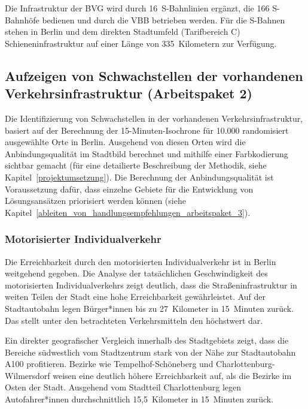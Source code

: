 Die Infrastruktur der BVG wird durch 16~S-Bahnlinien ergänzt, die 166 S-Bahnhöfe bedienen und durch die VBB betrieben werden. Für die S-Bahnen stehen in Berlin und dem direkten Stadtumfeld (Tarifbereich C) Schieneninfrastruktur auf einer Länge von 335~Kilometern zur Verfügung.

\subsection{Aufzeigen von Schwachstellen der vorhandenen Verkehrsinfrastruktur (Arbeitspaket 2)}

\label{aufzeigen_von_schwachstellen_der_vorhandenen_infrastruktur_arbeitspaket_2}

Die Identifizierung von Schwachstellen in der vorhandenen Verkehrsinfrastruktur, basiert auf der Berechnung der 15-Minuten-Isochrone für 10.000 randomisiert ausgewählte Orte in Berlin. Ausgehend von diesen Orten wird die Anbindungsqualität im Stadtbild berechnet und mithilfe einer Farbkodierung sichtbar gemacht (für eine detailierte Beschreibung der Methodik, siehe Kapitel~\ref{projektumsetzung}). Die Berechnung der Anbindungsqualität ist Voraussetzung dafür, dass einzelne Gebiete für die Entwicklung von Lösungsansätzen priorisiert werden können (siehe Kapitel~\ref{ableiten_von_handlungsempfehlungen_arbeitspaket_3}).

\subsubsection{Motorisierter Individualverkehr}

Die Erreichbarkeit durch den motorisierten Individualverkehr ist in Berlin weitgehend gegeben. Die Analyse der tatsächlichen Geschwindigkeit des motorisierten Individualverkehrs zeigt deutlich, dass die Straßeninfrastruktur in weiten Teilen der Stadt eine hohe Erreichbarkeit gewährleistet. Auf der Stadtautobahn legen Bürger*innen bis zu 27~Kilometer in 15~Minuten zurück. Das stellt unter den betrachteten Verkehrsmitteln den höchstwert dar.


Ein direkter geografischer Vergleich innerhalb des Stadtgebiets zeigt, dass die Bereiche südwestlich vom Stadtzentrum stark von der Nähe zur Stadtautobahn A100 profitieren. Bezirke wie Tempelhof-Schöneberg und Charlottenburg-Wilmersdorf weisen eine deutlich höhere Erreichbarkeit auf, als die Bezirke im Osten der Stadt. Ausgehend vom Stadtteil Charlottenburg legen Autofahrer*innen durchschnittlich 15,5~Kilometer in 15~Minuten zurück.

